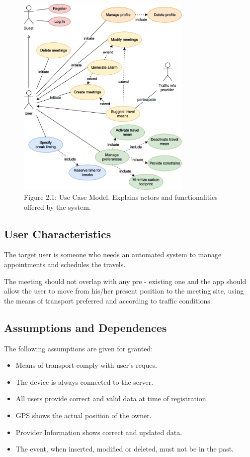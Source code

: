 \documentclass{article}
\begin{document}
	\bigskip
	\bigskip
	\begin{figure}[htbp]
		\begin{center}
		\includegraphics[width=0.75\textwidth]{img/diagrams/uc.png} \\ \bigskip
		Figure 2.1: Use Case Model. Explains actors and functionalities offered by the system.
		\label{default}
		\end{center}
	\end{figure}
	
	
	\subsection{User Characteristics}
	The target user is someone who needs an automated system to manage appointments and schedules the travels.

	The meeting should not overlap with any pre - existing one and the app should allow the user to move from his/her present position to the meeting site, using the means of transport preferred and according to traffic conditions. 
	
	
	\subsection{Assumptions and Dependences}
	The following assumptions are given for granted:
	\begin{itemize}
		\item  Means of transport comply with user’s reques.
		\item  The device is always connected to the server.
		\item  All users provide correct and valid data at time of registration.
		\item  GPS shows the actual position of the owner.
		\item  Provider Information shows correct and updated data.
		\item  The event, when inserted, modified or deleted, must not be in the past.
	\end{itemize}
	
\end{document}
